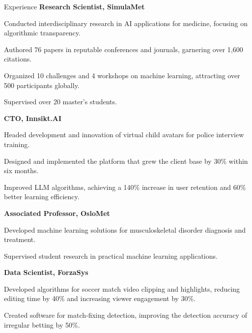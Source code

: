 \begin{rubric}{Experience}
%
\entry*[2021 -- present]%
\textbf{Research Scientist, SimulaMet} \par
\begin{compactitem}
\item Conducted interdisciplinary research in AI applications for medicine, focusing on algorithmic transparency.
\item Authored 76 papers in reputable conferences and journals, garnering over 1,600 citations.
\item Organized 10 challenges and 4 workshops on machine learning, attracting over 500 participants globally.
\item Supervised over 20 master's students.
\vspace{-12pt}
\end{compactitem}
%
\entry*[2023 -- present]%
\textbf{CTO, Innsikt.AI} \par
\begin{compactitem}
    \item Headed development and innovation of virtual child avatars for police interview training.
    \item Designed and implemented the platform that grew the client base by 30\% within six months.
    \item Improved LLM algorithms, achieving a 140\% increase in user retention and 60\% better learning efficiency.
    \vspace{-12pt}
\end{compactitem}
%
\entry*[2023 -- present]%
\textbf{Associated Professor, OsloMet} \par
\begin{compactitem}
    \item Developed machine learning solutions for musculoskeletal disorder diagnosis and treatment.
    \item Supervised student research in practical machine learning applications.
    \vspace{-12pt}
\end{compactitem}
%
\entry*[2022 -- 2023]%
\textbf{Data Scientist, ForzaSys} \par
\begin{compactitem}
    \item Developed algorithms for soccer match video clipping and highlights, reducing editing time by 40\% and increasing viewer engagement by 30\%.
    \item Created software for match-fixing detection, improving the detection accuracy of irregular betting by 50\%.

\end{compactitem}
\end{rubric}
